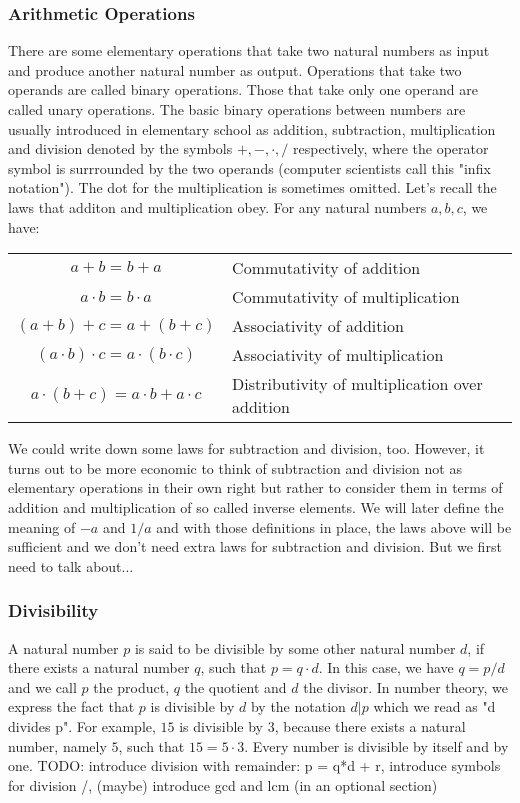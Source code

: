 \subsubsection{Arithmetic Operations}
There are some elementary operations that take two natural numbers as input and produce another natural number as output. Operations that take two operands are called binary operations. Those that take only one operand are called unary operations. The basic binary operations between numbers are usually introduced in elementary school as addition, subtraction, multiplication and division denoted by the symbols $+,-,\cdot,/$ respectively, where the operator symbol is surrrounded by the two operands (computer scientists call this "infix notation"). The dot for the multiplication is sometimes omitted. Let's recall the laws that additon and multiplication obey. For any natural numbers $a,b,c$, we have:

\medskip
\begin{tabular}{c l}
  $a + b = b + a$                             & Commutativity of addition \\
  $a \cdot b = b \cdot a$                     & Commutativity of multiplication \\
  $(a + b) + c = a + (b + c)$                 & Associativity of addition \\
  $(a \cdot b) \cdot c = a \cdot (b \cdot c)$ & Associativity of multiplication \\
  $a \cdot (b + c) = a \cdot b + a \cdot c$   & Distributivity of multiplication over addition
\end{tabular}
\medskip

We could write down some laws for subtraction and division, too. However, it turns out to be more economic to think of subtraction and division not as elementary operations in their own right but rather to consider them in terms of addition and multiplication of so called inverse elements. We will later define the meaning of $-a$ and $1/a$ and with those definitions in place, the laws above will be sufficient and we don't need extra laws for subtraction and division. But we first need to talk about...

\subsubsection{Divisibility}
A natural number $p$ is said to be divisible by some other natural number $d$, if there exists a natural number $q$, such that $p = q \cdot d$. In this case, we have $q = p/d$ and we call $p$ the product, $q$ the quotient and $d$ the divisor. In number theory, we express the fact that $p$ is divisible by $d$ by the notation $d | p$ which we read as "d divides p". For example, $15$ is divisible by $3$, because there exists a natural number, namely $5$, such that $15 = 5 \cdot 3$. Every number is divisible by itself and by one. TODO: introduce division with remainder: p = q*d + r, introduce symbols for division /, (maybe) introduce gcd and lcm (in an optional section)


